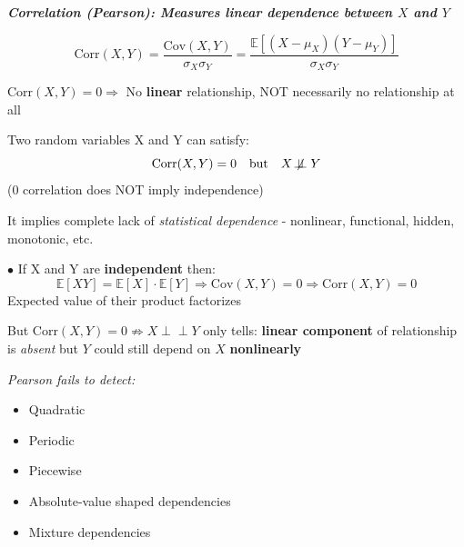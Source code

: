 \documentclass[../Main.tex]{subfiles}
\begin{document}
\vspace{0.3cm}

\textbf{\textit{Correlation (Pearson): Measures linear dependence between $X$ and $Y$}}

\[
\text{Corr}(X, Y) = \frac{\text{Cov}(X, Y)}{\sigma_X \sigma_Y}
= \frac{\mathbb{E}[(X - \mu_X)(Y - \mu_Y)]}{\sigma_X \sigma_Y}
\]

$\text{Corr}(X,Y) = 0 \Rightarrow$ No \textbf{linear} relationship, NOT necessarily no relationship at all

\vspace{0.2cm}

Two random variables X and Y can satisfy:
\[
\text{Corr}(X, Y) = 0 \quad \text{but} \quad X \not\!\perp\!\!\!\perp Y 
\]
($0$ correlation does NOT imply independence)

It implies complete lack of \textit{statistical dependence} - nonlinear, functional, hidden, monotonic, etc.

\vspace{0.3cm}

$\bullet$ If X and Y are \textbf{independent} then:
\[
\mathbb{E}[XY] = \mathbb{E}[X] \cdot \mathbb{E}[Y] \Rightarrow \text{Cov}(X,Y) = 0
\Rightarrow \text{Corr}(X,Y) = 0
\]
Expected value of their product factorizes

But $\text{Corr}(X,Y) = 0 \not\Rightarrow X \perp\!\!\!\perp Y$ only tells: \textbf{linear component} of relationship is \textit{absent} but $Y$ could still depend on $X$ \textbf{nonlinearly}

\textit{Pearson fails to detect:}
\begin{itemize}
    \item Quadratic
    \item Periodic 
    \item Piecewise
    \item Absolute-value shaped dependencies
    \item Mixture dependencies
\end{itemize}
\end{document}
